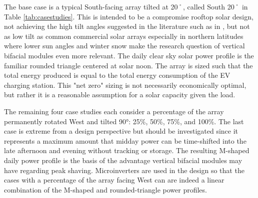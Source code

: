 \documentclass[journal,article,submit,pdftex,moreauthors]{Definitions/mdpi}
\begin{document}
The base case is a typical South-facing array tilted at 20˚, called South 20˚ in Table \ref{tab:casestudies}. This is intended to be a compromise rooftop solar design, not achieving the high tilt angles suggested in the literature such as in \cite{Baghoolizadeh2022}, but not as low tilt as common commercial solar arrays especially in northern latitudes where lower sun angles and winter snow make the research question of vertical bifacial modules even more relevant. The daily clear sky solar power profile is the familiar rounded triangle centered at solar noon. The array is sized such that the total energy produced is equal to the total energy consumption of the EV charging station. This "net zero" sizing is not necessarily economically optimal, but rather it is a reasonable assumption for a solar capacity given the load.

The remaining four case studies each consider a percentage of the array permanently rotated West and tilted 90°: 25\%, 50\%, 75\%, and 100\%. The last case is extreme from a design perspective but should be investigated since it represents a maximum amount that midday power can be time-shifted into the late afternoon and evening without tracking or storage. The resulting M-shaped daily power profile is the basis of the advantage vertical bifacial modules may have regarding peak shaving. Microinverters are used in the design so that the cases with a percentage of the array facing West can are indeed a linear combination of the M-shaped and rounded-triangle power profiles.
\end{document}
